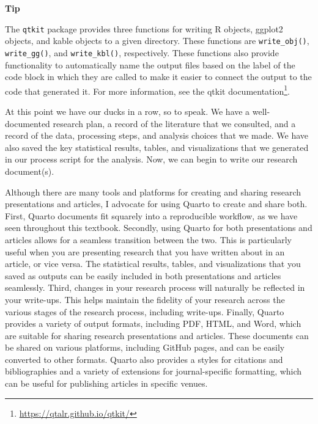 \documentclass[
  letterpaper,
]{latex/krantz}
\theoremstyle{definition}
\theoremstyle{remark}
\DeclareRobustCommand{\href}[2]{#2\footnote{\url{#1}}}
\begin{document}
\begin{tcolorbox}[enhanced jigsaw, colframe=quarto-callout-color-frame, breakable, bottomrule=.15mm, arc=.35mm, left=2mm, opacityback=0, rightrule=.15mm, colback=white, toprule=.15mm, leftrule=.75mm]

\textbf{ Tip}

The \texttt{qtkit} package provides three functions for writing R
objects, ggplot2 objects, and kable objects to a given directory. These
functions are \texttt{write\_obj()}, \texttt{write\_gg()}, and
\texttt{write\_kbl()}, respectively. These functions also provide
functionality to automatically name the output files based on the label
of the code block in which they are called to make it easier to connect
the output to the code that generated it. For more information, see the
\href{https://qtalr.github.io/qtkit/}{qtkit documentation}.

\end{tcolorbox}

At this point we have our ducks in a row, so to speak. We have a
well-documented research plan, a record of the literature that we
consulted, and a record of the data, processing steps, and analysis
choices that we made. We have also saved the key statistical results,
tables, and visualizations that we generated in our process script for
the analysis. Now, we can begin to write our research document(s).

Although there are many tools and platforms for creating and sharing
research presentations and articles, I advocate for using Quarto to
create and share both. First, Quarto documents fit squarely into a
reproducible workflow, as we have seen throughout this textbook.
Secondly, using Quarto for both presentations and articles allows for a
seamless transition between the two. This is particularly useful when
you are presenting research that you have written about in an article,
or vice versa. The statistical results, tables, and visualizations that
you saved as outputs can be easily included in both presentations and
articles seamlessly. Third, changes in your research process will
naturally be reflected in your write-ups. This helps maintain the
fidelity of your research across the various stages of the research
process, including write-ups. Finally, Quarto provides a variety of
output formats, including PDF, HTML, and Word, which are suitable for
sharing research presentations and articles. These documents can be
shared on various platforms, including GitHub pages, and can be easily
converted to other formats. Quarto also provides a styles for citations
and bibliographies and a variety of extensions for journal-specific
formatting, which can be useful for publishing articles in specific
venues.
\end{document}

